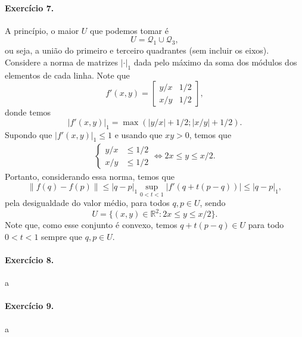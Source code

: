 \documentclass[12pt,a4paper]{article}
\newcommand{\R}{\mathbb{R}}
\begin{document}
\paragraph{Exercício 7.}
    A princípio, o maior $U$ que podemos tomar é
    \begin{equation*}
        U = \mathcal{Q}_1 \cup \mathcal{Q}_3,
    \end{equation*}
    ou seja, a união do primeiro e terceiro quadrantes (sem incluir os eixos). Considere a norma de matrizes $|\cdot|_1$ 
    dada pelo máximo da soma dos
    módulos dos elementos de cada linha. Note que
    \begin{equation*}
        f'(x,y) = 
        \begin{bmatrix}
            y/x & 1/2 \\
            x/y & 1/2
        \end{bmatrix},
    \end{equation*}
    donde temos
    \begin{equation*}
        |f'(x,y)|_1 = \max(|y/x| + 1/2; |x/y| + 1/2).
    \end{equation*}
    Supondo que $|f'(x,y)|_1 \leq 1$ e usando que $xy>0$, temos que
    \begin{align*}
        \begin{cases}
            y/x &\leq 1/2 \\
            x/y &\leq 1/2
        \end{cases} \iff
        2x \leq y \leq x/2.
    \end{align*}
    Portanto, considerando essa norma, temos que
    \begin{equation*}
        \| f(q) - f(p) \| \leq |q-p|_1\sup_{0<t<1}|f'(q + t(p-q))|
                          \leq |q-p|_1,
    \end{equation*}
    pela desigualdade do valor médio, para todos $q,p \in U$, sendo
    \begin{equation*}
        U = \{ (x,y)\in\R^2 : 2x \leq y \leq x/2 \}.
    \end{equation*}
    Note que, como esse conjunto é convexo, temos $q + t(p-q)\in U$
    para todo $0<t<1$ sempre que $q,p\in U$.
\paragraph{Exercício 8.}
    a
\paragraph{Exercício 9.}
    a
\end{document}
